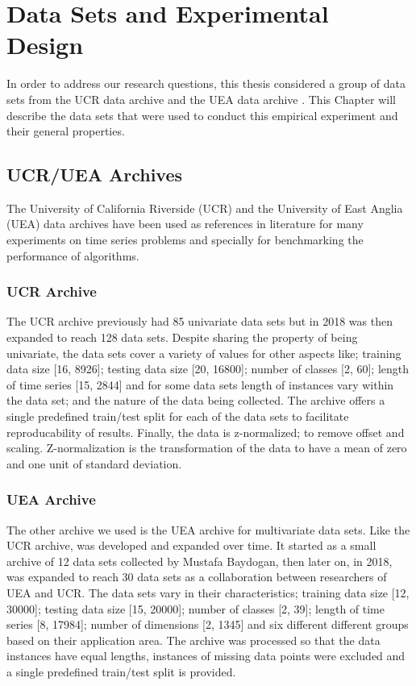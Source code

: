 \chapter{Data Sets and Experimental Design}
\label{Chapter data sets}
In order to address our research questions, this thesis considered a group of  data sets from the UCR data archive \cite{UCRArchive2018} and the UEA data archive \cite{bagnall2018uea}.
This Chapter will describe the  data sets that were used to conduct this empirical experiment and their general properties.

\section{UCR/UEA Archives}
\label{DataArchives}
The University of California Riverside (UCR) and the University of East Anglia (UEA) data archives have been used as references in literature for many experiments on time series problems \cite{abanda2019review,fawaz2020inceptiontime,bagnall2017great,yazdanbakhsh2019multivariate,ruiz2020great,fawaz2019deepreview}
and specially for benchmarking the performance of algorithms.

\subsection{UCR Archive}
\label{UCR}
The UCR archive previously had 85 univariate data sets but in 2018 was then expanded to reach 128 data sets.
Despite sharing the property of being univariate, the data sets cover a variety of values for other aspects like;
training data size [16, 8926]; testing data size [20, 16800]; number of classes [2, 60]; length of time series [15, 2844] and for some data sets length of instances vary within the data set;
and the nature of the data being collected. The archive offers a single predefined train/test split for each of the data sets to facilitate reproducability of results.
Finally, the data is z-normalized; to remove offset and scaling. Z-normalization is the transformation of the data to have a mean of zero and one unit of standard deviation.

\subsection{UEA Archive}
\label{UEA}
The other archive we used is the UEA archive for multivariate data sets. Like the UCR archive, was developed and expanded over time.
It started as a small archive of 12 data sets collected by Mustafa Baydogan,
then later on, in 2018, was expanded to reach 30 data sets as a collaboration between researchers of UEA and UCR. The data sets vary in their characteristics;
training data size [12, 30000]; testing data size [15, 20000]; number of classes [2, 39]; length of time series [8, 17984]; number of dimensions [2, 1345] and six different different groups based on their application area.
The archive was processed so that the data instances have equal lengths, instances of missing data points were excluded and a single predefined train/test split is provided.

